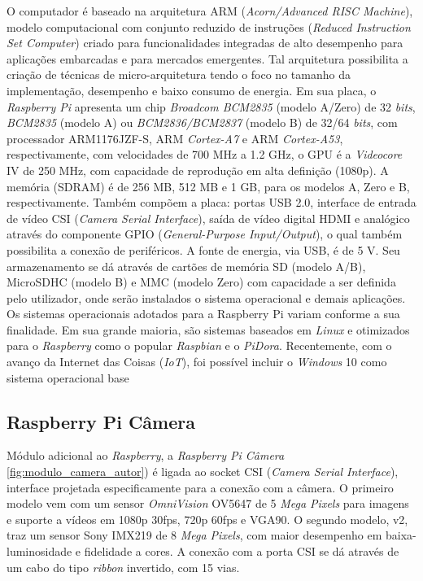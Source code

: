 \documentclass[12pt,oneside,a4paper,chapter=TITLE,section=TITLE,sumario=tradicional]{abntex2}
\begin{document}
O computador é baseado na arquitetura ARM (\textit{Acorn/Advanced RISC Machine}), modelo computacional com conjunto reduzido de instruções (\textit{Reduced Instruction Set Computer}) criado para funcionalidades integradas de alto desempenho para aplicações embarcadas e para mercados emergentes.
Tal arquitetura possibilita a criação de técnicas de micro-arquitetura tendo o foco no tamanho da implementação, desempenho e baixo consumo de energia. Em sua placa, o \textit{Raspberry Pi} apresenta um chip \textit{Broadcom BCM2835} (modelo A/Zero) de 32 \textit{bits}, \textit{BCM2835} (modelo A) ou \textit{BCM2836/BCM2837} (modelo B) de 32/64 \textit{bits}, com processador ARM1176JZF-S, ARM \textit{Cortex-A7} e ARM \textit{Cortex-A53}, respectivamente, com velocidades de 700 MHz a 1.2 GHz, o GPU é a \textit{Videocore} IV de 250 MHz, com capacidade de reprodução em alta definição (1080p). A memória (SDRAM) é de 256 MB, 512 MB e 1 GB, para os modelos A, Zero e B, respectivamente. Também compõem a placa: portas USB 2.0, interface de entrada de vídeo CSI (\textit{Camera Serial Interface}), saída de vídeo digital HDMI e analógico através do componente GPIO (\textit{General-Purpose Input/Output}), o qual também possibilita a conexão de periféricos. A fonte de energia, via USB, é de 5 V.
Seu armazenamento se dá através de cartões de memória SD (modelo A/B), MicroSDHC (modelo B) e MMC (modelo Zero) com capacidade a ser definida pelo utilizador, onde serão instalados o sistema operacional e demais aplicações.
Os sistemas operacionais adotados para a Raspberry Pi variam conforme a sua finalidade. Em sua grande maioria, são sistemas baseados em \textit{Linux} e otimizados para o \textit{Raspberry} como o popular \textit{Raspbian} e o \textit{PiDora}. Recentemente, com o avanço da Internet das Coisas (\textit{IoT}), foi possível incluir o \textit{Windows} 10 como sistema operacional base

\subsection{Raspberry Pi Câmera}
Módulo adicional ao \textit{Raspberry}, a \textit{Raspberry Pi Câmera} \autoref{fig:modulo_camera_autor}) é ligada ao socket CSI (\textit{Camera Serial Interface}), interface projetada especificamente para a conexão com a câmera. O primeiro modelo vem com um sensor \textit{OmniVision} OV5647 de 5 \textit{Mega Pixels} para imagens e suporte a vídeos em 1080p 30fps, 720p 60fps e VGA90. O segundo modelo, v2, traz um sensor Sony IMX219 de 8 \textit{Mega Pixels}, com maior desempenho em baixa-luminosidade e fidelidade a cores. A conexão com a porta CSI se dá através de um cabo do tipo \textit{ribbon} invertido, com 15 vias.
\end{document}

